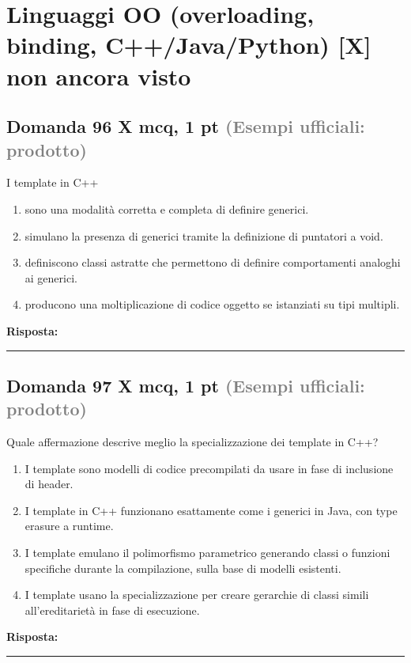 \documentclass[a4paper,11pt]{article}
\begin{document}
\section{Linguaggi OO (overloading, binding, C++/Java/Python) [X] non ancora visto}

\subsection*{Domanda 96 X \hfill {\small mcq, 1 pt \textcolor{gray}{(Esempi ufficiali: prodotto)}}}
I template in C++

\begin{enumerate}[label=\alph*)]
\item sono una modalità corretta e completa di definire generici.
\item simulano la presenza di generici tramite la definizione di puntatori a void.
\item definiscono classi astratte che permettono di definire comportamenti analoghi ai generici.
\item producono una moltiplicazione di codice oggetto se istanziati su tipi multipli.
\end{enumerate}
\vspace{0.2cm}
\noindent\textbf{Risposta:}\par
\vspace{1.5cm}\hrule


\subsection*{Domanda 97 X \hfill {\small mcq, 1 pt \textcolor{gray}{(Esempi ufficiali: prodotto)}}}
Quale affermazione descrive meglio la specializzazione dei template in C++?

\begin{enumerate}[label=\alph*)]
\item I template sono modelli di codice precompilati da usare in fase di inclusione di header.
\item I template in C++ funzionano esattamente come i generici in Java, con type erasure a runtime.
\item I template emulano il polimorfismo parametrico generando classi o funzioni specifiche durante la compilazione, sulla base di modelli esistenti.
\item I template usano la specializzazione per creare gerarchie di classi simili all'ereditarietà in fase di esecuzione.
\end{enumerate}
\vspace{0.2cm}
\noindent\textbf{Risposta:}\par
\vspace{1.5cm}\hrule
\end{document}
